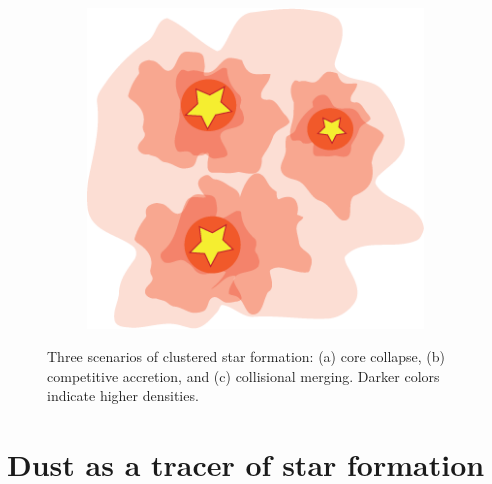 \begin{figure}[ht!]
\begin{center}
\begin{subfigure}[b]{0.3\textwidth}
\caption{}
\label{subfig:scenarios:b}
\end{subfigure}
\begin{subfigure}[b]{0.3\textwidth}
\centering
\includegraphics[width=0.98\textwidth]{Figures/Coalescence.png} 
\caption{}
\label{subfig:scenarios:c}
\end{subfigure}
\caption[Scenarios of clustered star formation]{Three scenarios of clustered star formation: (a) core collapse, (b) competitive accretion, and (c) collisional merging. Darker colors indicate higher densities.}
\label{fig:SFscenarios}
\end{center}
\end{figure}



%

\section{Dust as a tracer of star formation}
\label{subsec:dust}

